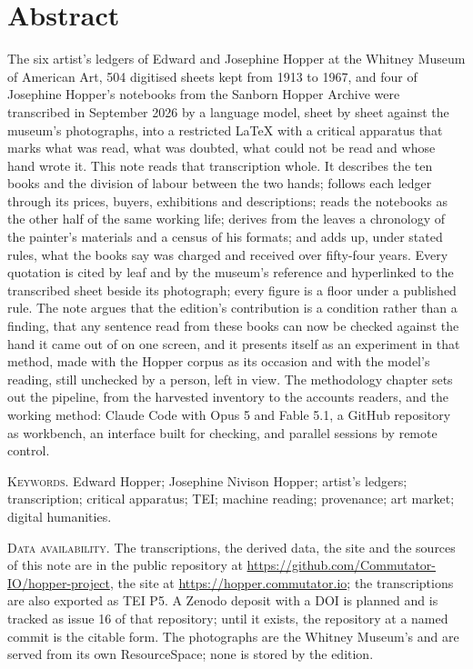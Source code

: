 \chapter*{Abstract}

The six artist's ledgers of Edward and Josephine Hopper at the Whitney Museum of American Art, 504 digitised sheets kept from 1913 to 1967, and four of Josephine Hopper's notebooks from the Sanborn Hopper Archive were transcribed in September 2026 by a language model, sheet by sheet against the museum's photographs, into a restricted LaTeX with a critical apparatus that marks what was read, what was doubted, what could not be read and whose hand wrote it. This note reads that transcription whole. It describes the ten books and the division of labour between the two hands; follows each ledger through its prices, buyers, exhibitions and descriptions; reads the notebooks as the other half of the same working life; derives from the leaves a chronology of the painter's materials and a census of his formats; and adds up, under stated rules, what the books say was charged and received over fifty-four years. Every quotation is cited by leaf and by the museum's reference and hyperlinked to the transcribed sheet beside its photograph; every figure is a floor under a published rule. The note argues that the edition's contribution is a condition rather than a finding, that any sentence read from these books can now be checked against the hand it came out of on one screen, and it presents itself as an experiment in that method, made with the Hopper corpus as its occasion and with the model's reading, still unchecked by a person, left in view. The methodology chapter sets out the pipeline, from the harvested inventory to the accounts readers, and the working method: Claude Code with Opus 5 and Fable 5.1, a GitHub repository as workbench, an interface built for checking, and parallel sessions by remote control.

\vspace{1em}\noindent\textsc{Keywords.} Edward Hopper; Josephine Nivison Hopper; artist's ledgers; transcription; critical apparatus; TEI; machine reading; provenance; art market; digital humanities.

\vspace{1em}\noindent\textsc{Data availability.} The transcriptions, the derived data, the site and the sources of this note are in the public repository at \url{https://github.com/Commutator-IO/hopper-project}, the site at \url{https://hopper.commutator.io}; the transcriptions are also exported as TEI P5. A Zenodo deposit with a DOI is planned and is tracked as issue 16 of that repository; until it exists, the repository at a named commit is the citable form. The photographs are the Whitney Museum's and are served from its own ResourceSpace; none is stored by the edition.
